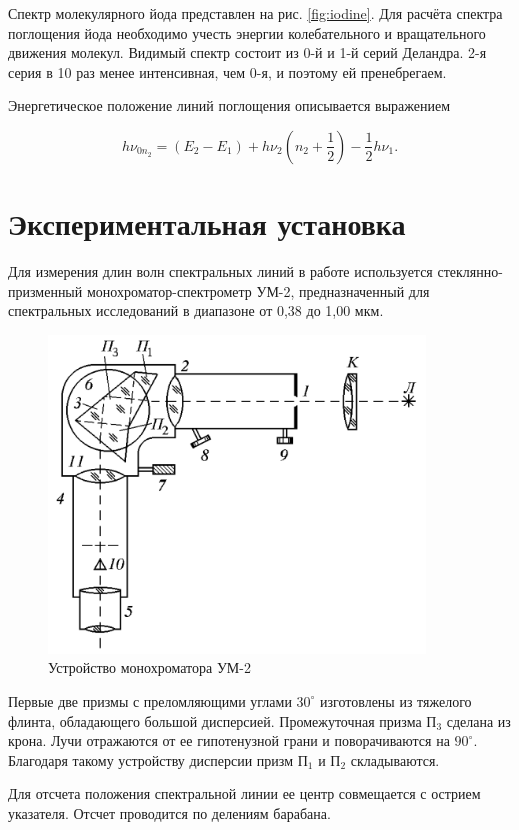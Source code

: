 \documentclass[12pt,a4paper]{article}
\begin{document}
	
	Спектр молекулярного йода представлен на рис. \ref{fig:iodine}.
	Для расчёта спектра поглощения йода необходимо учесть энергии колебательного и вращательного движения молекул. Видимый спектр состоит из 0-й и 1-й серий Деландра. 2-я серия в 10 раз менее интенсивная, чем 0-я, и поэтому ей пренебрегаем. 
	
	Энергетическое	положение линий поглощения описывается выражением
 
	\begin{equation}\label{eq:iodine}
		h \nu_{0 n_2} = (E_2 - E_1 )+ h \nu_2 \left(n_2+\dfrac{1}{2}\right) - \dfrac{1}{2}h \nu_1.
	\end{equation}
 
	\section*{Экспериментальная установка}

	Для измерения длин волн спектральных линий в работе используется стеклянно-призменный монохроматор-спектрометр УМ-2, предназначенный для спектральных исследований в диапазоне от 0,38 до 1,00 мкм.
	\begin{figure}[h!]
		\centering
		\includegraphics[width=10cm]{res/scheme.png}
		\caption{Устройство монохроматора УМ-2}
	\end{figure}
	Первые две призмы с преломляющими углами $30^\circ$ изготовлены из тяжелого флинта, обладающего большой дисперсией. Промежуточная призма П$_3$ сделана из крона. Лучи отражаются от ее гипотенузной грани и поворачиваются на $90^\circ$. Благодаря такому устройству дисперсии призм П$_1$ и П$_2$ складываются.
	
	Для отсчета положения спектральной линии ее центр совмещается с острием указателя. Отсчет проводится по делениям барабана.
	
\end{document}
